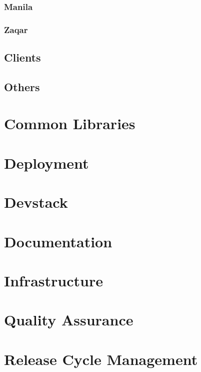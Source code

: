 \documentclass[a4wide,11pt]{report}
\begin{document}
\newpage 
\subsubsection{Manila}


\newpage 
\subsubsection{Zaqar}


\newpage
\subsection{Clients}


\newpage
\subsection{Others}


\newpage
\section{Common Libraries}


\newpage
\section{Deployment}


\newpage
\section{Devstack}


\newpage
\section{Documentation}


\newpage
\section{Infrastructure}


\newpage
\section{Quality Assurance}


\newpage
\section{Release Cycle Management}

\end{document}
